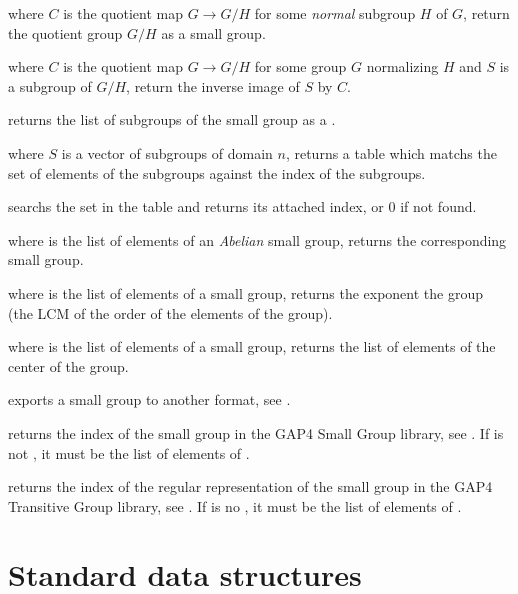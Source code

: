  where $C$ is the quotient map
$G\rightarrow G/H$ for some \emph{normal} subgroup $H$ of $G$, return the
quotient group $G/H$ as a small group.

 where $C$ is the
quotient map $G\rightarrow G/H$ for some group $G$ normalizing $H$ and $S$ is
a subgroup of $G/H$, return the inverse image of $S$ by $C$.

 returns the list of subgroups of the
small group  as a .

 where $S$ is a vector of subgroups
of domain $n$, returns a table which matchs the set of elements of the
subgroups against the index of the subgroups.

 searchs the set  in
the table  and returns its attached index, or $0$ if not found.

 where  is the list of
elements of an \emph{Abelian} small group, returns the corresponding
small group.

 where  is the list of
elements of a small group, returns the exponent the group (the LCM of the order
of the elements of the group).

 where  is the list of elements
of a small group, returns the list of elements of the center of the
group.

 exports a small group
to another format, see .

 returns the index of the small group
 in the GAP4 Small Group library, see . If
 is not , it must be the list of elements of .

 returns the index of the
regular representation of the small group  in the GAP4 Transitive
Group library, see . If  is no , it must be
the list of elements of .

\newpage
\chapter{Standard data structures}

